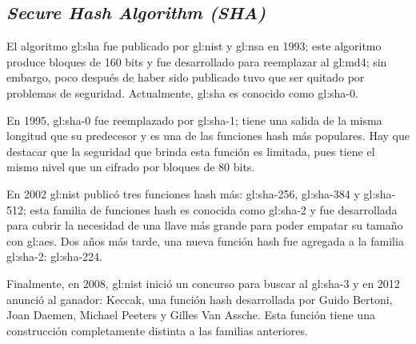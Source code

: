 %
%
%

\subsection{\textit{Secure Hash Algorithm (SHA)}}

El algoritmo \gls{gl:sha} fue publicado por \gls{gl:nist} y
\gls{gl:nsa} en 1993; este algoritmo produce bloques de 160 bits y
fue desarrollado para reemplazar al \gls{gl:md4}; sin embargo, poco
después de haber sido publicado tuvo que ser quitado por problemas de
seguridad. Actualmente, \gls{gl:sha} es conocido como \gls{gl:sha}-0.

En 1995, \gls{gl:sha}-0 fue reemplazado por \gls{gl:sha}-1; tiene
una salida de la misma longitud que su predecesor y es una de las funciones
hash más populares. Hay que destacar que la seguridad que brinda esta función
es limitada, pues tiene el mismo nivel que un cifrado por bloques de 80 bits.

En 2002 \gls{gl:nist} publicó tres funciones hash más:
\gls{gl:sha}-256, \gls{gl:sha}-384 y \gls{gl:sha}-512; esta
familia de funciones hash es conocida como \gls{gl:sha}-2 y fue
desarrollada para cubrir la necesidad de una llave más grande para poder
empatar su tamaño con \gls{gl:aes}. Dos años más tarde, una nueva
función hash fue agregada a la familia \gls{gl:sha}-2:
\gls{gl:sha}-224.

Finalmente, en 2008, \gls{gl:nist} inició un concurso para buscar al
\gls{gl:sha}-3 y en 2012 anunció al ganador: Keccak, una función hash
desarrollada por Guido Bertoni, Joan Daemen, Michael Peeters y Gilles Van
Assche. Esta función tiene una construcción completamente distinta a las
familias anteriores.
